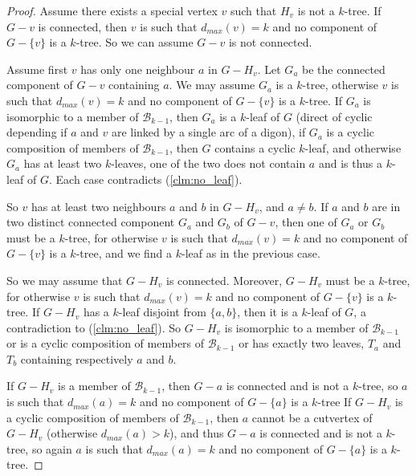 \begin{proof}
Assume there exists a special vertex $v$ such that $H_v$ is not a $k$-tree. 
If $G-v$ is connected, then $v$ is such that $d_{max}(v) = k$ and no component of $G - \{ v \}$ is a $k$-tree. 
So we can assume $G-v$ is not connected. 

Assume first $v$ has only one neighbour $a$ in $G-H_v$. Let $G_a$ be the connected component of $G-v$ containing $a$. We may assume  $G_a$ is a $k$-tree, otherwise $v$ is such that $d_{max}(v) = k$ and no component of $G - \{ v \}$ is a $k$-tree.  
If $G_a$ is isomorphic to a member of $\mathcal B_{k-1}$, then $G_a$ is a $k$-leaf of $G$ (direct of cyclic depending if $a$ and $v$ are linked by a single arc of a digon), if $G_a$ is a cyclic composition of members of $\mathcal B_{k-1}$, then $G$ contains a cyclic $k$-leaf, and otherwise $G_a$ has at least two $k$-leaves, one of the two does not contain $a$ and is thus a $k$-leaf of $G$. Each case contradicts (\ref{clm:no_leaf}).


So $v$ has at least two neighbours $a$ and $b$ in $G-H_v$, and $a \neq b$. 
If $a$ and $b$ are in two distinct connected component $G_a$ and $G_b$ of $G-v$, then one of $G_a$ or $G_b$ must be a $k$-tree, for otherwise $v$ is such that $d_{max}(v) = k$ and no component of $G - \{ v \}$ is a $k$-tree, and we find a $k$-leaf as in the previous case.

So we may assume that $G-H_v$ is connected. 
Moreover, $G-H_v$ must be a $k$-tree, for otherwise $v$ is such that $d_{max}(v) = k$ and no component of $G - \{ v \}$ is a $k$-tree.
If $G-H_v$ has a $k$-leaf disjoint from $\{a,b\}$, then it is a $k$-leaf of $G$, a contradiction to (\ref{clm:no_leaf}). So $G-H_v$ is isomorphic to a member of $\mathcal B_{k-1}$ or is a cyclic composition of members of $\mathcal B_{k-1}$ or has exactly two leaves, $T_a$ and $T_b$ containing respectively $a$ and $b$. 

If $G-H_v$ is a member of $\mathcal B_{k-1}$, then $G-a$ is connected and is not a $k$-tree, so $a$ is such that $d_{max}(a) = k$ and no component of $G - \{ a \}$ is a $k$-tree 
If $G-H_v$ is a cyclic composition of members of $\mathcal B_{k-1}$, then $a$ cannot be a cutvertex of $G-H_v$ (otherwise $d_{max}(a)>k$), and thus $G-a$ is connected and is not a $k$-tree, so again $a$ is such that $d_{max}(a) = k$ and no component of $G - \{ a \}$ is a $k$-tree. 


\end{proof}

